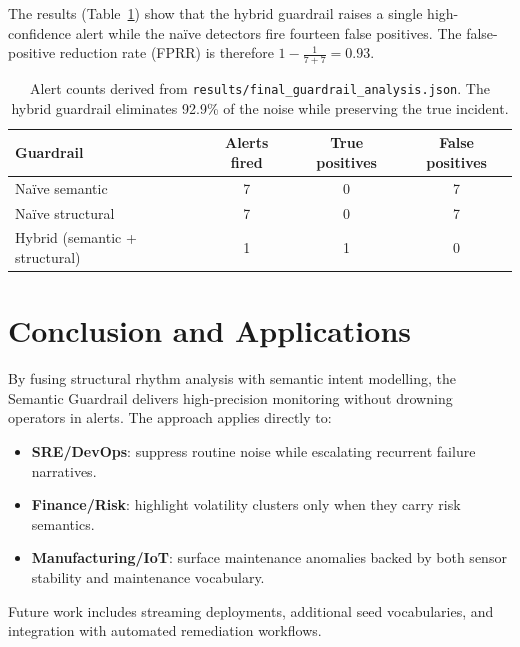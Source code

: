 \documentclass[11pt]{article}
\begin{document}
The results (Table~\ref{tab:alerts}) show that the hybrid guardrail raises a
single high-confidence alert while the naïve detectors fire fourteen
false positives. The false-positive reduction rate (FPRR) is therefore
\(1 - \tfrac{1}{7+7} = 0.93\).

\begin{table}[h]
  \centering
  \begin{tabular}{lccc}
    \toprule
    Guardrail & Alerts fired & True positives & False positives \\
    \midrule
    Naïve semantic & 7 & 0 & 7 \\
    Naïve structural & 7 & 0 & 7 \\
    Hybrid (semantic + structural) & 1 & 1 & 0 \\
    \bottomrule
  \end{tabular}
  \caption{Alert counts derived from \texttt{results/final\_guardrail\_analysis.json}. The
           hybrid guardrail eliminates 92.9\% of the noise while preserving the
           true incident.}
  \label{tab:alerts}
\end{table}

\section{Conclusion and Applications}
By fusing structural rhythm analysis with semantic intent modelling, the
Semantic Guardrail delivers high-precision monitoring without drowning operators
in alerts. The approach applies directly to:
\begin{itemize}
  \item \textbf{SRE/DevOps}: suppress routine noise while escalating recurrent
        failure narratives.
  \item \textbf{Finance/Risk}: highlight volatility clusters only when they carry
        risk semantics.
  \item \textbf{Manufacturing/IoT}: surface maintenance anomalies backed by both
        sensor stability and maintenance vocabulary.
\end{itemize}
Future work includes streaming deployments, additional seed vocabularies, and
integration with automated remediation workflows.
\end{document}
